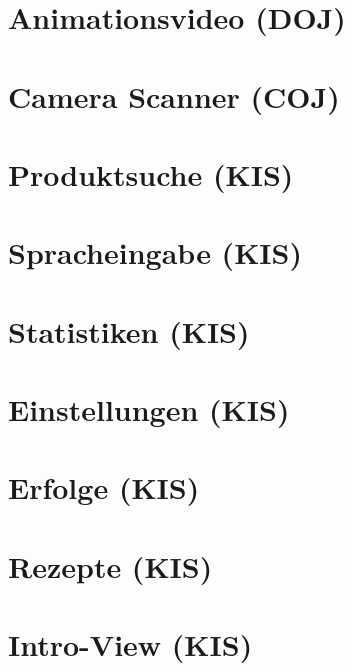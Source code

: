 \documentclass[
    headings=optiontotocandhead,%
    twoside,
    numbers=noenddot,%
    toc=flat, %
    12pt, %
    titlepage, %
    parskip=full, %
    listof=totoc, %
    listof=flat, %
    numbers=noenddot, %
    bibliography=totoc, %
    a4paper,DIV=14,
    BCOR=15mm,
]{scrbook}
\begin{document}
\chapter{Animationsvideo (DOJ)}
\renewcommand{\kapitelautor}{Autor: Rafael Doja}

\chapter{Camera Scanner (COJ)}
\renewcommand{\kapitelautor}{Autor: Filip Coja}


\chapter{Produktsuche (KIS)}
\renewcommand{\kapitelautor}{Autor: Daniel Kisling}


\chapter{Spracheingabe (KIS)}
\renewcommand{\kapitelautor}{Autor: Daniel Kisling}

\chapter{Statistiken (KIS)}
\renewcommand{\kapitelautor}{Autor: Daniel Kisling}

\chapter{Einstellungen (KIS)}
\renewcommand{\kapitelautor}{Autor: Daniel Kisling}


\chapter{Erfolge (KIS)}
\renewcommand{\kapitelautor}{Autor: Daniel Kisling}

\chapter{Rezepte (KIS)}
\renewcommand{\kapitelautor}{Autor: Daniel Kisling}

\chapter{Intro-View (KIS)}
\renewcommand{\kapitelautor}{Autor: Daniel Kisling}
\end{document}
